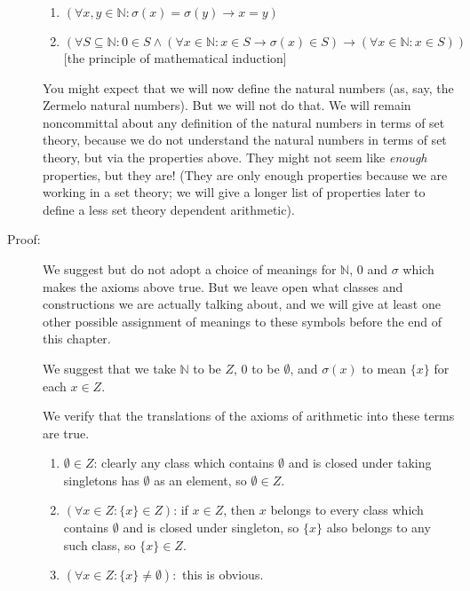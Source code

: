 \documentclass[12pt]{article}
\begin{document}
\begin{description}
\begin{enumerate}
\item $(\forall x,y \in \mathbb N:\sigma(x) = \sigma(y) \rightarrow x=y)$

\item $$(\forall S \subseteq \mathbb N:0 \in S \wedge (\forall x\in \mathbb N:x \in S \rightarrow \sigma(x) \in S) \rightarrow (\forall x \in \mathbb N:x \in S))$$ [the principle of mathematical induction]

\end{enumerate}

You might expect that we will now define the natural numbers (as, say, the Zermelo natural numbers).  But we will not do that.  We will remain noncommittal about any definition of the natural numbers in terms of set theory, because we do not understand the natural numbers in terms of set theory, but via the properties above.  They might not seem like {\em enough\/} properties, but they are!  (They are only enough properties because we are working in a set theory;  we will give a longer list of properties later to define a less set theory dependent arithmetic).

\item[Proof:]  We suggest but do not adopt a choice of meanings for $\mathbb N$, 0 and $\sigma$ which makes the axioms above true.  But we leave open what classes and constructions we are actually talking about, and we will give at least one other possible assignment of meanings to these symbols before the end of this chapter.

We suggest that we take $\mathbb N$ to be $Z$, 0 to be $\emptyset$, and $\sigma(x)$ to mean $\{x\}$ for each $x \in Z$.

We verify that the translations of the axioms of arithmetic into these terms are true.

\begin{enumerate}

\item $\emptyset \in Z$:  clearly any class which contains $\emptyset$ and is closed under taking singletons has $\emptyset$ as an element, so  $\emptyset \in Z$.

\item $(\forall x \in Z:\{x\} \in Z)$:  if $x \in Z$, then $x$ belongs to every class which contains $\emptyset$ and is closed under singleton, so $\{x\}$ also belongs to any such class, so $\{x\} \in Z$.

\item $(\forall x \in Z:\{x\} \neq \emptyset):$  this is obvious.


\end{enumerate}
\end{description}
\end{document}
